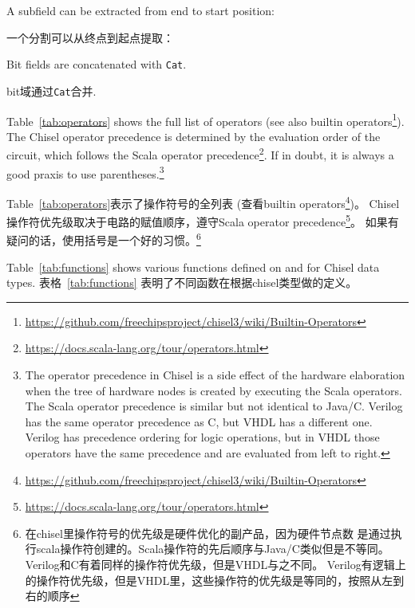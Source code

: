 \documentclass[%
    10pt,
    headinclude, footexclude,
    openright, %
    notitlepage,
    cleardoubleempty,
    headsepline,
    pointlessnumbers,
    bibtotoc, idxtotoc,
    ]{scrbook}
\newcommand{\code}[1]{{\small{\texttt{#1}}}}
\newcommand{\myref}[2]{\href{#1}{#2}}
\renewcommand{\myref}[2]{{#2}{\footnote{\url{#1}}}}
\begin{document}
\noindent A subfield can be extracted from end to start position:

\noindent 一个分割可以从终点到起点提取：


\noindent Bit fields are concatenated with \code{Cat}.

\noindent bit域通过\code{Cat}合并.


Table~\ref{tab:operators} shows the full list of operators
(see also \myref{https://github.com/freechipsproject/chisel3/wiki/Builtin-Operators}{builtin operators}).
The Chisel operator precedence is determined by the evaluation order of the circuit,
which follows the \myref{https://docs.scala-lang.org/tour/operators.html}{Scala operator precedence}.
If in doubt, it is always a good praxis to use parentheses.\footnote{The operator precedence in
Chisel is a side effect of the hardware elaboration when the tree of hardware nodes
is created by executing the Scala operators. The Scala operator precedence is similar but
not identical to Java/C. Verilog has the same operator precedence as C, but VHDL
has a different one. Verilog has precedence ordering for logic operations, but in VHDL
those operators have the same precedence and are evaluated from left to right.}

Table~\ref{tab:operators}表示了操作符号的全列表
(查看\myref{https://github.com/freechipsproject/chisel3/wiki/Builtin-Operators}{builtin operators})。
Chisel操作符优先级取决于电路的赋值顺序，遵守\myref{https://docs.scala-lang.org/tour/operators.html}{Scala operator precedence}。
如果有疑问的话，使用括号是一个好的习惯。\footnote{在chisel里操作符号的优先级是硬件优化的副产品，因为硬件节点数
是通过执行scala操作符创建的。Scala操作符的先后顺序与Java/C类似但是不等同。Verilog和C有着同样的操作符优先级，但是VHDL与之不同。
Verilog有逻辑上的操作符优先级，但是VHDL里，这些操作符的优先级是等同的，按照从左到右的顺序}


Table~\ref{tab:functions} shows various functions defined on and for Chisel data types.
表格~\ref{tab:functions} 表明了不同函数在根据chisel类型做的定义。
\end{document}

